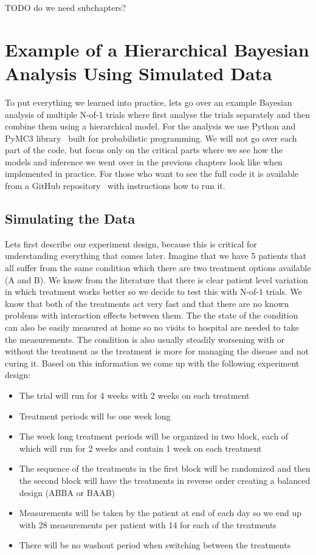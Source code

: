 \documentclass[12pt,a4paper,leqno]{report}
\theoremstyle{plain}
\theoremstyle{definition}
\theoremstyle{remark}
\begin{document}
TODO do we need subchapters?

\chapter{Example of a Hierarchical Bayesian Analysis Using Simulated
  Data}\label{example}

To put everything we learned into practice, lets go over an example Bayesian
analysis of multiple N-of-1 trials where first analyse the trials separately and then combine
them using a hierarchical model. For the analysis we use Python and PyMC3 library\ \cite{pymc3} built
for probabilistic programming. We will not go over each part of the code, but focus only
on the critical parts where we see how the models and inference we went over in the
previous chapters look like when implemented in practice. For those who want to see the
full code it is available from a GitHub repository\ \cite{github} with instructions how to run it.

\section{Simulating the Data}

Lets first describe our experiment design, because this is critical for understanding
everything that comes later. Imagine that we have 5 patients that all suffer from the
same condition which there are two treatment options available (A and B). We know from the
literature that there is clear patient level variation in which treatment works better
so we decide to test this with N-of-1 trials. We know that both of the treatments act
very fast and that there are no known problems with interaction effects between them.
The the state of the condition can also be easily measured at home so no visits to
hospital are needed to take the measurements. The condition is also usually steadily
worsening with or without the treatment as the treatment is more for managing the
disease and not curing it. Based on this information we come up with the following experiment design:

\begin{itemize}
    \item The trial will run for 4 weeks with 2 weeks on each treatment
    \item Treatment periods will be one week long
    \item The week long treatment periods will be organized in two block, each of which will run for
    2 weeks and contain 1 week on each treatment
    \item The sequence of the treatments in the first block will be randomized and then
    the second block will have the treatments in reverse order creating a balanced
    design (ABBA or BAAB)
    \item Measurements will be taken by the patient at end of each day so we end up with
    28 measurements per patient with 14 for each of the treatments
    \item There will be no washout period when switching between the treatments
\end{itemize}
\end{document}
